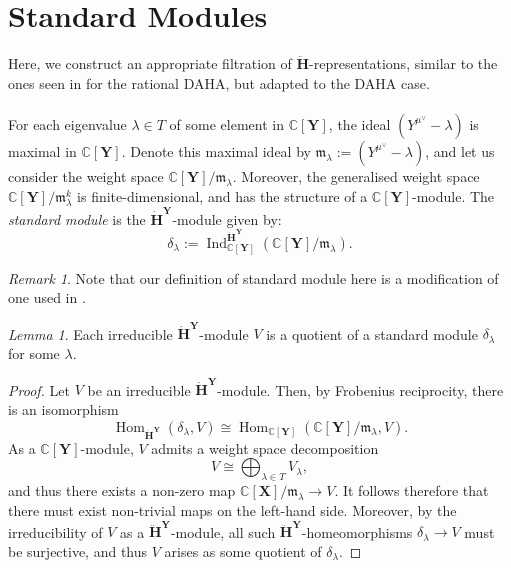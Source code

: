 \documentclass[a4paper]{report}
\theoremstyle{theorem}
\theoremstyle{definition}
\theoremstyle{remark}
\newtheorem{remark}{Remark}
\theoremstyle{proposition}
\theoremstyle{conjecture}
\theoremstyle{lemma}
\newtheorem{lemma}{Lemma}
\theoremstyle{corollary}
\theoremstyle{exercise}
\theoremstyle{example}
\newcommand{\C}{\mathbb{C}}
\newcommand{\on}{\operatorname}
\begin{document}
  \section{Standard Modules}
  
  Here, we construct an appropriate filtration of $\mathbf{\ddot{\mathbf{H}}}$-representations, 
  similar to the ones seen in 
  \cite[\S 2.3]{ggor03} for the rational DAHA, but adapted to the DAHA case. \\\\
  For each eigenvalue $\lambda \in T$ of some element in $\C[\mathbf{Y}]$, the 
  ideal $(Y^{\mu^\vee} - \lambda)$ is maximal in $\C[\mathbf{Y}]$. 
  Denote this maximal ideal by $\mathfrak{m}_\lambda := (Y^{\mu^\vee}-\lambda)$,
  and let us consider the weight space $\C[\mathbf{Y}]/\mathfrak{m}_\lambda$.
  Moreover, the generalised weight space $\C[\mathbf{Y}]/\mathfrak{m}_\lambda^k$ 
  is finite-dimensional, and has the structure of a $\C[\mathbf{Y}]$-module. 
  The \emph{standard module} is the $\mathbf{\dot{H}}^{\mathbf{Y}}$-module
  given by:
  $$\delta_\lambda := \on{Ind}_{\C[\mathbf{Y}]}^{\mathbf{\dot{H}}^{\mathbf{Y}}} \left(\C[\mathbf{Y}]/\mathfrak{m}_\lambda\right).$$
  
  \begin{remark}
      Note that our definition of standard module here is a modification of
      one used in \cite{ggor03}. 
  \end{remark}
  
  \begin{lemma}\label{lem_quot}
      Each irreducible $\mathbf{\dot{H}}^{\mathbf{Y}}$-module $V$ is a quotient 
      of a standard module $\delta_\lambda$ for some $\lambda$.
  \end{lemma}
  
  \begin{proof}
      Let $V$ be an irreducible $\mathbf{\dot{H}}^{\mathbf{Y}}$-module.
      Then, by Frobenius reciprocity, there is an isomorphism
      $$\on{Hom}_{\mathbf{\dot{H}}^{\mathbf{Y}}}(\delta_\lambda, V) \cong \on{Hom}_{\C[\mathbf{Y}]}(\C[\mathbf{Y}]/\mathfrak{m}_\lambda,V).$$
      As a $\C[\mathbf{Y}]$-module, $V$ admits a weight space 
      decomposition $$V \cong \bigoplus_{\lambda \in T} V_\lambda,$$
      and thus there exists a non-zero map 
      $\C[\mathbf{X}]/\mathfrak{m}_\lambda \to V$. It follows therefore that 
      there must exist non-trivial maps on the left-hand side. Moreover, by the 
      irreducibility of $V$ as a $\mathbf{\ddot{\mathbf{H}}}^{\mathbf{Y}}$-module, all 
      such $\mathbf{\ddot{\mathbf{H}}}^{\mathbf{Y}}$-homeomorphisms $\delta_\lambda \to V$
      must be surjective, and thus 
      $V$ arises as some quotient of $\delta_\lambda$.
  
  \end{proof}
  
\end{document}
